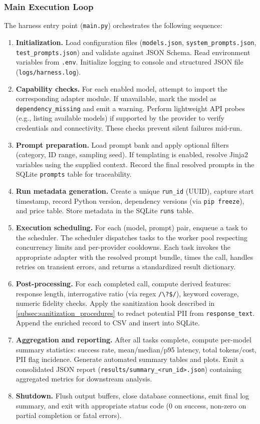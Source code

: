 \subsubsection{Main Execution Loop}

The harness entry point (\texttt{main.py}) orchestrates the following sequence:

\begin{enumerate}
\item \textbf{Initialization.} Load configuration files (\texttt{models.json}, \texttt{system\_prompts.json}, \texttt{test\_prompts.json}) and validate against JSON Schema. Read environment variables from \texttt{.env}. Initialize logging to console and structured JSON file (\texttt{logs/harness.log}).
\item \textbf{Capability checks.} For each enabled model, attempt to import the corresponding adapter module. If unavailable, mark the model as \texttt{dependency\_missing} and emit a warning. Perform lightweight API probes (e.g., listing available models) if supported by the provider to verify credentials and connectivity. These checks prevent silent failures mid-run.
\item \textbf{Prompt preparation.} Load prompt bank and apply optional filters (category, ID range, sampling seed). If templating is enabled, resolve Jinja2 variables using the supplied context. Record the final resolved prompts in the SQLite \texttt{prompts} table for traceability.
\item \textbf{Run metadata generation.} Create a unique \texttt{run\_id} (UUID), capture start timestamp, record Python version, dependency versions (via \texttt{pip freeze}), and price table. Store metadata in the SQLite \texttt{runs} table.
\item \textbf{Execution scheduling.} For each (model, prompt) pair, enqueue a task to the scheduler. The scheduler dispatches tasks to the worker pool respecting concurrency limits and per-provider cooldowns. Each task invokes the appropriate adapter with the resolved prompt bundle, times the call, handles retries on transient errors, and returns a standardized result dictionary.
\item \textbf{Post-processing.} For each completed call, compute derived features: response length, interrogative ratio (via regex \texttt{/\textbackslash?\$/}), keyword coverage, numeric fidelity checks. Apply the sanitization hook described in \cref{subsec:sanitization_procedures} to redact potential PII from \texttt{response\_text}. Append the enriched record to CSV and insert into SQLite.
\item \textbf{Aggregation and reporting.} After all tasks complete, compute per-model summary statistics: success rate, mean/median/p95 latency, total tokens/cost, PII flag incidence. Generate automated summary tables and plots. Emit a consolidated JSON report (\texttt{results/summary\_<run\_id>.json}) containing aggregated metrics for downstream analysis.
\item \textbf{Shutdown.} Flush output buffers, close database connections, emit final log summary, and exit with appropriate status code (0 on success, non-zero on partial completion or fatal errors).
\end{enumerate}

